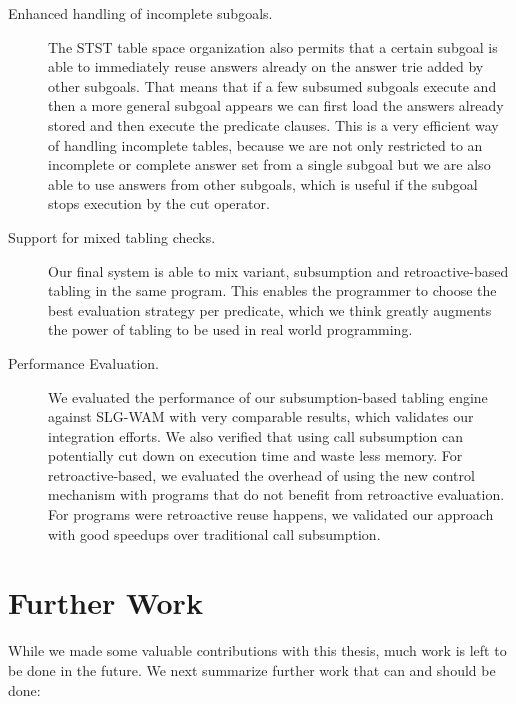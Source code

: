 \begin{description}
   \item[Enhanced handling of incomplete subgoals.] The STST table space organization also permits that a certain
   subgoal is able to immediately reuse answers already on the answer trie added by other subgoals. That means that if a
   few subsumed subgoals execute and then a more general subgoal appears we can first load the answers already stored and
   then execute the predicate clauses. This is a very efficient way of handling incomplete tables, because we are
   not only restricted to an incomplete or complete answer set from a single subgoal but we are also able to use
   answers from other subgoals, which is useful if the subgoal stops execution by the cut operator.
   
   \item[Support for mixed tabling checks.] Our final system is able to mix variant, subsumption and retroactive-based
   tabling in the same program. This enables the programmer to choose the best evaluation strategy per predicate,
   which we think greatly augments the power of tabling to be used in real world programming.
   
   \item[Performance Evaluation.] We evaluated the performance of our subsumption-based tabling engine
   against SLG-WAM with very comparable results, which validates our integration efforts. We also verified
   that using call subsumption can potentially cut down on execution time and waste less memory.
   For retroactive-based, we evaluated the overhead of using the new control mechanism with programs that do
   not benefit from retroactive evaluation. For programs were retroactive reuse happens, we validated our
   approach with good speedups over traditional call subsumption.
   
\end{description}


\section{Further Work}

While we made some valuable contributions with this thesis, much work is left to be done in the future.
We next summarize further work that can and should be done:

